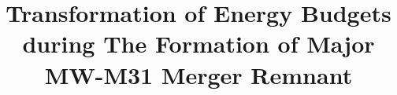 \documentclass[twocolumn]{aastex631}
\begin{document}
\title{Transformation of Energy Budgets during The Formation of Major MW-M31 Merger Remnant}


\end{document}
